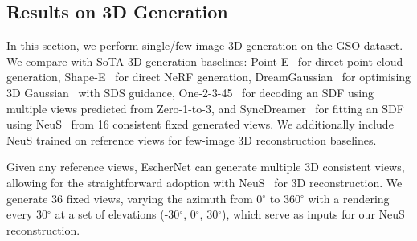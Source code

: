 \documentclass[10pt,twocolumn,letterpaper]{article}
\begin{document}
\subsection{Results on 3D Generation}

In this section, we perform single/few-image 3D generation on the GSO dataset. We compare with SoTA 3D generation baselines: Point-E~\cite{nichol2022pointe} for direct point cloud generation, Shape-E~\cite{jun2023shape} for direct NeRF generation, DreamGaussian~\cite{jun2023shape} for optimising 3D Gaussian~\cite{kerbl20233gaussian} with SDS guidance, One-2-3-45~\cite{liu2023one} for decoding an SDF using multiple views predicted from Zero-1-to-3, and SyncDreamer~\cite{liu2023syncdreamer} for fitting an SDF using NeuS~\cite{wang2021neus} from 16 consistent fixed generated views. We additionally include NeuS trained on reference views for few-image 3D reconstruction baselines.  

Given any reference views, EscherNet can generate multiple 3D consistent views, allowing for the straightforward adoption with NeuS~\cite{wang2021neus} for 3D reconstruction. We generate 36 fixed views, varying the azimuth from 0$^{\circ}$ to 360$^{\circ}$ with a rendering every 30$^{\circ}$ at a set of elevations (-30$^{\circ}$, 0$^{\circ}$, 30$^{\circ}$), which serve as inputs for our NeuS reconstruction.
\end{document}

